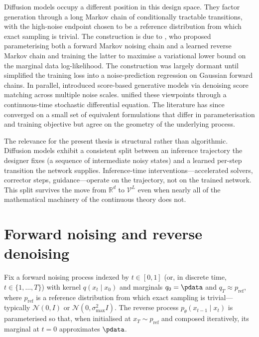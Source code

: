 Diffusion models occupy a different position in this design space. They
factor generation through a long Markov chain of conditionally tractable
transitions, with the high-noise endpoint chosen to be a reference
distribution from which exact sampling is trivial. The construction is due
to \textcite{sohldickstein2015deep}, who proposed parameterising both a
forward Markov noising chain and a learned reverse Markov chain and training
the latter to maximise a variational lower bound on the marginal data
log-likelihood. The construction was largely dormant until
\textcite{ho2020ddpm} simplified the training loss into a noise-prediction
regression on Gaussian forward chains. In parallel, \textcite{song2019ncsn}
introduced score-based generative models via denoising score matching across
multiple noise scales. \textcite{song2021score} unified these viewpoints
through a continuous-time stochastic differential equation. The literature
has since converged on a small set of equivalent formulations that differ in
parameterisation and training objective but agree on the geometry of the
underlying process.

The relevance for the present thesis is structural rather than
algorithmic. Diffusion models exhibit a consistent split between an inference
trajectory the designer fixes (a sequence of intermediate noisy states) and
a learned per-step transition the network supplies. Inference-time
interventions---accelerated solvers, corrector steps, guidance---operate on
the trajectory, not on the trained network. This split survives the move
from $\mathbb{R}^d$ to $\mathcal{V}^L$ even when nearly all of the
mathematical machinery of the continuous theory does not.

\section{Forward noising and reverse denoising}
\label{lit:sec:fwd-rev}

Fix a forward noising process indexed by $t\in[0,1]$ (or, in discrete
time, $t\in\{1,\ldots,T\}$) with kernel $q(x_t\mid x_0)$ and marginals
$q_0 = \pdata$ and $q_T \approx p_{\mathrm{ref}}$, where
$p_{\mathrm{ref}}$ is a reference distribution from which exact sampling
is trivial---typically $\mathcal{N}(0,I)$ or
$\mathcal{N}(0,\sigma_{\max}^2 I)$. The reverse process
$p_\theta(x_{t-1}\mid x_t)$ is parameterised so that, when initialised at
$x_T \sim p_{\mathrm{ref}}$ and composed iteratively, its marginal at
$t=0$ approximates $\pdata$.

